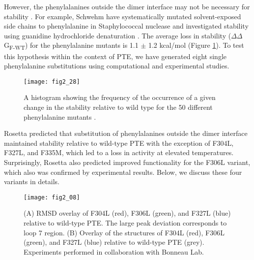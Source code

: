 \begin{refsection}
However, the phenylalanines outside the dimer interface may not be necessary
for stability \cite{Pakula1990a,Schwehm1998}. For example, Schwehm  have systematically mutated solvent-exposed side chains to phenylalanine in
Staphylococcal nuclease and investigated stability using guanidine
hydrochloride denaturation \cite{Schwehm1998}. The average loss in
stability ($\Delta$$\Delta$G\textsubscript{F-WT}) for the phenylalanine mutants
is 1.1 $\pm$ 1.2 kcal/mol \cite{Schwehm1998} (Figure \ref{fig:phe50}). To test
this hypothesis within the context of PTE, we have generated eight single
phenylalanine substitutions using computational and experimental studies.
\begin{figure}[htbp] \centering \texttt{[image: fig2\_28]}
    \caption[A histogram showing the frequency of the occurrence of a given
    change in the stability relative to wild type for the 50 different
phenylalanine mutants.]{A histogram showing the frequency of the occurrence of
    a given change in the stability relative to wild type for the 50 different
    phenylalanine mutants \cite{Schwehm1998}.}
    \label{fig:phe50}
\end{figure}

Rosetta predicted that substitution of phenylalanines outside the dimer
interface maintained stability relative to wild-type PTE with the exception of
F304L, F327L, and F335M, which led to a loss in activity at elevated
temperatures. Surprisingly, Rosetta also predicted improved functionality for
the F306L variant, which also was confirmed by experimental results. Below, we
discuss these four variants in details.
\begin{figure}[htbp] \centering \texttt{[image: fig2\_08]}
    \caption[(A) RMSD overlay of F304L (red), F306L (green), and F327L (blue)
        relative to wild-type PTE. The large peak deviation corresponds to loop
        7 region. (B) Overlay of the structures of F304L (red),  F306L (green),
    and F327L (blue) relative to wild-type PTE (grey).] {(A) RMSD overlay of
        F304L (red), F306L (green), and F327L (blue) relative to wild-type PTE.
        The large peak deviation corresponds to loop 7 region. (B) Overlay of
        the structures of F304L (red),  F306L (green), and F327L (blue)
        relative to wild-type PTE (grey). Experiments performed in
    collaboration with Bonneau Lab.}
    \label{fig:rmsd}
\end{figure}


\end{refsection}
